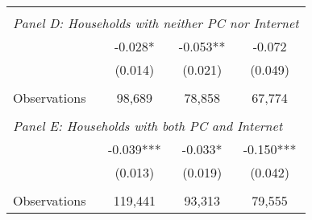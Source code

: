 {\begin{tabular}{lccc}
&  &  &   \\
\multicolumn{4}{l}{\textit{Panel D: Households with neither PC nor Internet}} \\
\hspace{3mm}        &      -0.028*  &      -0.053** &      -0.072   \\
                    &     (0.014)   &     (0.021)   &     (0.049)   \\
                    &               &               &               \\
\hspace{3mm}Observations&      98,689   &      78,858   &      67,774   \\
 
&  &  &   \\
\multicolumn{4}{l}{\textit{Panel E: Households with both PC and Internet}} \\
\hspace{3mm}        &      -0.039***&      -0.033*  &      -0.150***\\
                    &     (0.013)   &     (0.019)   &     (0.042)   \\
                    &               &               &               \\
\hspace{3mm}Observations&     119,441   &      93,313   &      79,555   \\
 

\bottomrule
\end{tabular}
}

